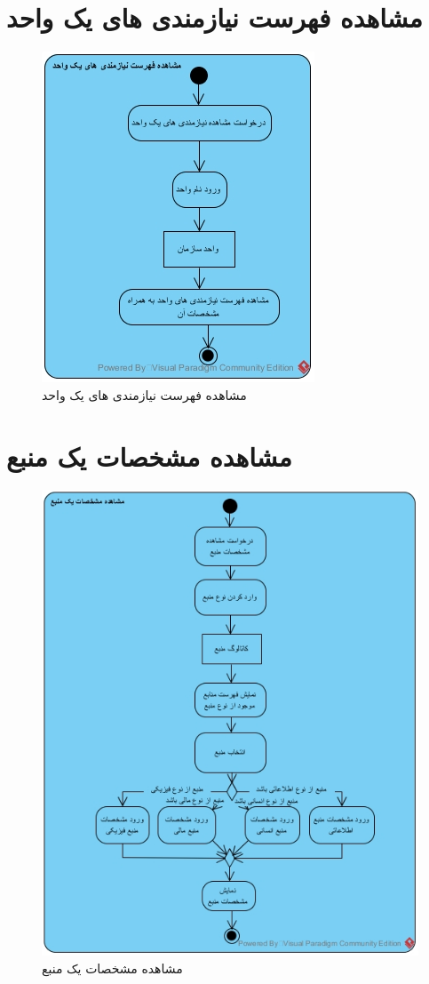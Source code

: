 \section{مشاهده فهرست نیازمندی های یک واحد}
\begin{figure}[H]
	\centering
	\includegraphics[scale=0.8]{img/activity/viewrequnit}
	\caption{مشاهده فهرست نیازمندی های یک واحد}
\end{figure}


\section{مشاهده مشخصات یک منبع}
\begin{figure}[H]
	\centering
	\includegraphics[scale=0.8]{img/activity/viewres}
	\caption{مشاهده مشخصات یک منبع}
\end{figure}

